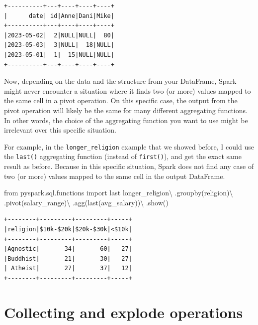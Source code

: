 \documentclass[
  11pt,
  letterpaper,
  DIV=11,
  numbers=noendperiod]{scrreprt}
\newenvironment{Shaded}{\begin{snugshade}}{\end{snugshade}}
\newcommand{\ImportTok}[1]{\textcolor[rgb]{0.00,0.46,0.62}{#1}}
\newcommand{\NormalTok}[1]{\textcolor[rgb]{0.00,0.23,0.31}{#1}}
\newcommand{\OperatorTok}[1]{\textcolor[rgb]{0.37,0.37,0.37}{#1}}
\newcommand{\StringTok}[1]{\textcolor[rgb]{0.13,0.47,0.30}{#1}}
\begin{document}
\begin{verbatim}
+----------+---+----+----+----+
|      date| id|Anne|Dani|Mike|
+----------+---+----+----+----+
|2023-05-02|  2|NULL|NULL|  80|
|2023-05-03|  3|NULL|  18|NULL|
|2023-05-01|  1|  15|NULL|NULL|
+----------+---+----+----+----+
\end{verbatim}

Now, depending on the data and the structure from your DataFrame, Spark
might never encounter a situation where it finds two (or more) values
mapped to the same cell in a pivot operation. On this specific case, the
output from the pivot operation will likely be the same for many
different aggregating functions. In other words, the choice of the
aggregating function you want to use might be irrelevant over this
specific situation.

For example, in the \texttt{longer\_religion} example that we showed
before, I could use the \texttt{last()} aggregating function (instead of
\texttt{first()}), and get the exact same result as before. Because in
this specific situation, Spark does not find any case of two (or more)
values mapped to the same cell in the output DataFrame.

\begin{Shaded}
\begin{Highlighting}[]
\ImportTok{from}\NormalTok{ pyspark.sql.functions }\ImportTok{import}\NormalTok{ last}
\NormalTok{longer\_religion}\OperatorTok{\textbackslash{}}
\NormalTok{    .groupby(}\StringTok{\textquotesingle{}religion\textquotesingle{}}\NormalTok{)}\OperatorTok{\textbackslash{}}
\NormalTok{    .pivot(}\StringTok{\textquotesingle{}salary\_range\textquotesingle{}}\NormalTok{)}\OperatorTok{\textbackslash{}}
\NormalTok{    .agg(last(}\StringTok{\textquotesingle{}avg\_salary\textquotesingle{}}\NormalTok{))}\OperatorTok{\textbackslash{}}
\NormalTok{    .show()}
\end{Highlighting}
\end{Shaded}

\begin{verbatim}
+--------+---------+---------+-----+
|religion|$10k-$20k|$20k-$30k|<$10k|
+--------+---------+---------+-----+
|Agnostic|       34|       60|   27|
|Buddhist|       21|       30|   27|
| Atheist|       27|       37|   12|
+--------+---------+---------+-----+
\end{verbatim}

\hypertarget{collecting-and-explode-operations}{%
\section{Collecting and explode
operations}\label{collecting-and-explode-operations}}
\end{document}
